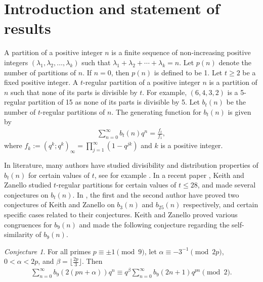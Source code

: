 \documentclass[reqno]{amsart}
\theoremstyle{definition}
\theoremstyle{remark}
\newtheorem{conj}[theorem]{Conjecture}
\numberwithin{equation}{section}
\begin{document}
\maketitle
\section{Introduction and statement of results} 
 A partition of a positive integer $n$ is a finite sequence of non-increasing positive integers $(\lambda_1, \lambda_2, \ldots, \lambda_k)$ such that $\lambda_1+\lambda_2+\cdots +\lambda_k=n$. 
 Let $p(n)$ denote the number of partitions of $n$. If $n=0$, then $p(n)$ is defined to be 1. Let $t\geq 2$ be a fixed positive integer. 
 A $t$-regular partition of a positive integer $n$ is a partition of $n$ such that none of its parts is divisible by $t$. 
 For example, $(6, 4, 3, 2)$ is a 5-regular partition of 15 as none of its parts is divisible by 5. Let $b_{t}(n)$ be the number of $t$-regular partitions of $n$. The generating function for $b_{t}(n)$ is given by 
\begin{align}\label{gen_fun}
\sum_{n=0}^{\infty}b_{t}(n)q^n=\frac{f_{t}}{f_1},
\end{align}
where $f_k:=(q^k; q^k)_{\infty}=\prod_{j=1}^{\infty}(1-q^{jk})$ and $k$ is a positive integer. 
 \par 
 In literature, many authors have studied divisibility and distribution properties of $b_{t}(n)$ for certain values of $t$, see for example \cite{baruahdas, calkin, cui_Gu_2013, cui_Gu_2015, gordon1997, hirschhorn_sellers, Keith2014,Keith2021,xia_yao,zhao_jin_yao}. 
 In a recent paper \cite{Keith2021}, Keith and Zanello studied $t$-regular partitions for certain values of $t\leq 28$, and made several conjectures on $b_t(n)$. 
 In \cite{SB1, SB2}, the first and the second author have proved two conjectures of Keith and Zanello on $b_3(n)$ and $b_{25}(n)$ respectively, and certain specific cases related to their conjectures. 
 Keith and Zanello proved various congruences for $b_9(n)$ and made the following conjecture regarding the self-similarity of $b_9(n)$.
\begin{conj}\cite[Conjecture 9]{Keith2021}\label{conj1}
For all primes $p\equiv \pm 1\pmod 9$, let $\alpha\equiv-3^{-1}\pmod{2p}$, $0<\alpha<2p$, and $\beta= \lfloor \frac{2p}{3}\rfloor$. Then
\begin{align}\label{new-eq-2}
\sum_{n=0}^{\infty}b_{9}(2(pn+\alpha))q^n\equiv q^{\beta}\sum_{n=0}^{\infty}b_{9}(2n+1)q^{pn}\pmod 2.
\end{align}
\end{conj}
\end{document}
